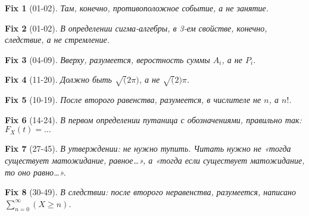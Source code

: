 \documentclass{article}
\newtheorem*{fix}{Fix}
\begin{document}
  \begin{fix}[01-02]
    Там, конечно, противоположное событие, а не занятие.
  \end{fix}

  \begin{fix}[01-02]
    В определении сигма-алгебры, в 3-ем свойстве, конечно, следствие, а не стремление.
  \end{fix}

  \begin{fix}[04-09]
    Вверху, разумеется, веростность суммы \(A_i\), а не \(P_i\).
  \end{fix}

  \begin{fix}[11-20]
    Должно быть \(\sqrt(2\pi)\), а не \(\sqrt(2)\pi\).
  \end{fix}

  \begin{fix}[10-19]
    После второго равенства, разумеется, в числителе не \(n\), а \(n!\).
  \end{fix}

  \begin{fix}[14-24]
    В первом определении путаница с обозначениями, правильно так: \(F_X(t) = \ldots\)
  \end{fix}

  \begin{fix}[27-45]
    В утверждении: не нужно тупить. Читать нужно не «тогда существует матожидание, равное…», а «тогда если существует матожидание, то оно равно…».
  \end{fix}

  \begin{fix}[30-49]
    В следствии: после второго неравенства, разумеется, написано \(\sum\limits_{n=0}^{\infty}(X \ge n)\).
  \end{fix}
\end{document}
